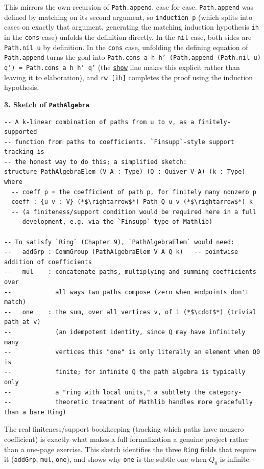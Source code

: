 This mirrors the own recursion of \texttt{Path.append}, case for case. \texttt{Path.append} was defined by matching on its second argument, so \texttt{induction p} (which splits into cases on exactly that argument, generating the matching induction hypothesis \texttt{ih} in the \texttt{cons} case) unfolds the definition directly. In the \texttt{nil} case, both sides are \texttt{Path.nil u} by definition. In the \texttt{cons} case, unfolding the defining equation of \texttt{Path.append} turns the goal into \texttt{Path.cons a h h' (Path.append (Path.nil u) q') = Path.cons a h h' q'} (the \href{https://lean-lang.org/doc/reference/latest/Tactic-Proofs/Tactic-Reference/}{\texttt{show}} line makes this explicit rather than leaving it to elaboration), and \texttt{rw [ih]} completes the proof using the induction hypothesis.

\textbf{3. Sketch of \texttt{PathAlgebra}}

\begin{lstlisting}
-- A k-linear combination of paths from u to v, as a finitely-supported
-- function from paths to coefficients. `Finsupp`-style support tracking is
-- the honest way to do this; a simplified sketch:
structure PathAlgebraElem (V A : Type) (Q : Quiver V A) (k : Type) where
  -- coeff p = the coefficient of path p, for finitely many nonzero p
  coeff : {u v : V} (*$\rightarrow$*) Path Q u v (*$\rightarrow$*) k
  -- (a finiteness/support condition would be required here in a full
  -- development, e.g. via the `Finsupp` type of Mathlib)

-- To satisfy `Ring` (Chapter 9), `PathAlgebraElem` would need:
--   addGrp : CommGroup (PathAlgebraElem V A Q k)   -- pointwise addition of coefficients
--   mul    : concatenate paths, multiplying and summing coefficients over
--            all ways two paths compose (zero when endpoints don't match)
--   one    : the sum, over all vertices v, of 1 (*$\cdot$*) (trivial path at v)
--            (an idempotent identity, since Q may have infinitely many
--            vertices this "one" is only literally an element when Q0 is
--            finite; for infinite Q the path algebra is typically only
--            a "ring with local units," a subtlety the category-
--            theoretic treatment of Mathlib handles more gracefully than a bare Ring)
\end{lstlisting}

The real finiteness/support bookkeeping (tracking which paths have nonzero coefficient) is exactly what makes a full formalization a genuine project rather than a one-page exercise. This sketch identifies the three \texttt{Ring} fields that require it (\texttt{addGrp}, \texttt{mul}, \texttt{one}), and shows why \texttt{one} is the subtle one when \(Q_0\) is infinite.

